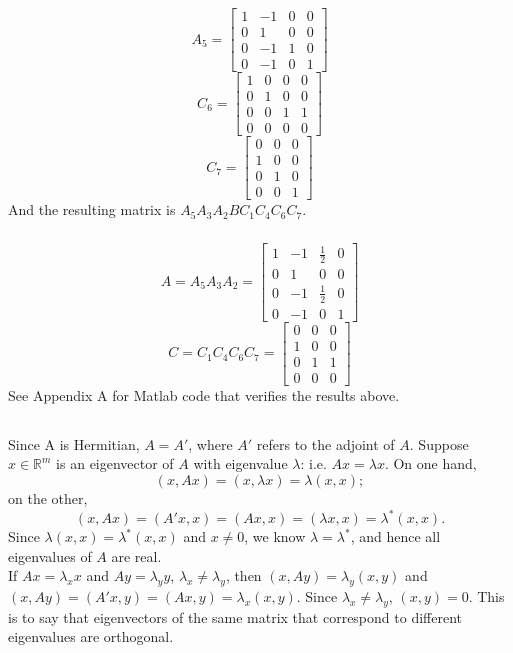 \documentclass[11pt]{article}
\begin{document}
$$A_5=\begin{bmatrix} 1&-1&0&0\\0&1&0&0\\0&-1&1&0\\0&-1&0&1\end{bmatrix} $$
$$C_6=\begin{bmatrix} 1&0&0&0\\0&1&0&0\\0&0&1&1\\0&0&0&0\end{bmatrix}$$
$$C_7=\begin{bmatrix} 0&0&0\\1&0&0\\0&1&0\\0&0&1\end{bmatrix} $$
And the resulting matrix is $A_5A_3A_2BC_1C_4C_6C_7$. 
\subsubsection{}
$$A=A_5A_3A_2=\begin{bmatrix} 1&-1&\frac12&0\\0&1&0&0\\0&-1&\frac12&0\\0&-1&0&1\end{bmatrix} $$
$$C=C_1C_4C_6C_7=\begin{bmatrix} 0&0&0\\1&0&0\\0&1&1\\0&0&0\end{bmatrix} $$
See Appendix A for Matlab code that verifies the results above.
\subsection{}
Since A is Hermitian, $A=A'$, where $A'$ refers to the adjoint of $A$. Suppose $x\in\mathbb{R}^m$ is an eigenvector of $A$ with eigenvalue $\lambda$: i.e. $Ax=\lambda x$. On one hand, $$(x,Ax)=(x, \lambda x) = \lambda(x,x);$$ on the other, $$(x,Ax)=(A'x, x)=(Ax,x)=(\lambda x,x)=\lambda^*(x,x).$$ Since $\lambda(x,x)=\lambda^*(x,x)$ and $x\neq0$, we know $\lambda=\lambda^*$, and hence all eigenvalues of $A$ are real.  \\[0.5cm]
If $Ax=\lambda_xx$ and $Ay=\lambda_yy$, $\lambda_x\neq\lambda_y$, then $(x,Ay) = \lambda_y(x,y)$ and $(x,Ay)=(A'x,y)=(Ax,y)=\lambda_x(x,y)$. Since $\lambda_x\neq\lambda_y$, $(x,y)=0$. This is to say that eigenvectors of the same matrix that correspond to different eigenvalues are orthogonal. 
\end{document}
